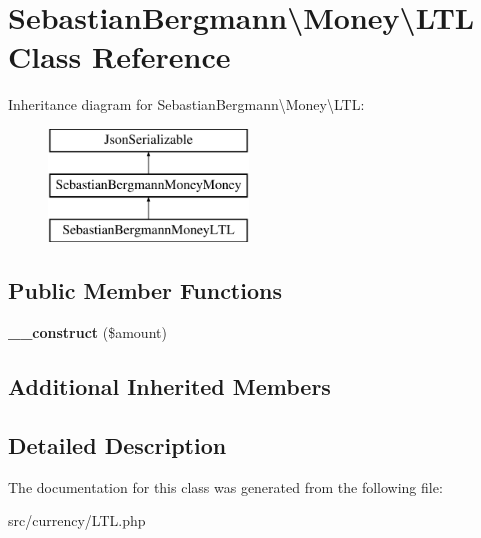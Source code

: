 \hypertarget{classSebastianBergmann_1_1Money_1_1LTL}{}\section{Sebastian\+Bergmann\textbackslash{}Money\textbackslash{}L\+T\+L Class Reference}
\label{classSebastianBergmann_1_1Money_1_1LTL}
Inheritance diagram for Sebastian\+Bergmann\textbackslash{}Money\textbackslash{}L\+T\+L\+:\begin{figure}[H]
\begin{center}
\leavevmode
\includegraphics[height=3.000000cm]{classSebastianBergmann_1_1Money_1_1LTL}
\end{center}
\end{figure}
\subsection*{Public Member Functions}
\begin{DoxyCompactItemize}
\item 
\hypertarget{classSebastianBergmann_1_1Money_1_1LTL_a282815c0d89790714cc57df6ba5ebc91}{}{\bfseries \+\_\+\+\_\+construct} (\$amount)\label{classSebastianBergmann_1_1Money_1_1LTL_a282815c0d89790714cc57df6ba5ebc91}

\end{DoxyCompactItemize}
\subsection*{Additional Inherited Members}


\subsection{Detailed Description}


The documentation for this class was generated from the following file\+:\begin{DoxyCompactItemize}
\item 
src/currency/L\+T\+L.\+php\end{DoxyCompactItemize}
